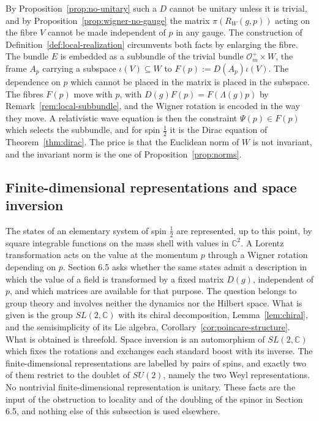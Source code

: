 \begin{remark}
	By Proposition~\ref{prop:no-unitary} such a $D$ cannot be unitary unless it is trivial, and by Proposition~\ref{prop:wigner-no-gauge} the matrix $\pi(R_W(g,p))$ acting on the fibre $V$ cannot be made independent of $p$ in any gauge. The construction of Definition~\ref{def:local-realization} circumvents both facts by enlarging the fibre. The bundle $E$ is embedded as a subbundle of the trivial bundle $\mathcal{O}_m^+\times W$, the frame $A_p$ carrying a subspace $\iota(V)\subseteq W$ to $F(p):=D(A_p)\iota(V)$. The dependence on $p$ which cannot be placed in the matrix is placed in the subspace. The fibres $F(p)$ move with $p$, with $D(g)F(p)=F(\Lambda(g)p)$ by Remark~\ref{rem:local-subbundle}, and the Wigner rotation is encoded in the way they move. A relativistic wave equation is then the constraint $\Psi(p)\in F(p)$ which selects the subbundle, and for spin $\tfrac12$ it is the Dirac equation of Theorem~\ref{thm:dirac}. The price is that the Euclidean norm of $W$ is not invariant, and the invariant norm is the one of Proposition~\ref{prop:norms}.
\end{remark}

\subsection{Finite-dimensional representations and space inversion}
\label{subsec:finite-reps-inversion}

The states of an elementary system of spin $\frac12$ are represented, up to this point, by square integrable functions on the mass shell with values in $\mathbb{C}^2$. A Lorentz transformation acts on the value at the momentum $p$ through a Wigner rotation depending on $p$. Section 6.5 asks whether the same states admit a description in which the value of a field is transformed by a fixed matrix $D(g)$, independent of $p$, and which matrices are available for that purpose. The question belongs to group theory and involves neither the dynamics nor the Hilbert space. What is given is the group $SL(2,\mathbb{C})$ with its chiral decomposition, Lemma~\ref{lem:chiral}, and the semisimplicity of its Lie algebra, Corollary~\ref{cor:poincare-structure}. What is obtained is threefold. Space inversion is an automorphism of $SL(2,\mathbb{C})$ which fixes the rotations and exchanges each standard boost with its inverse. The finite-dimensional representations are labelled by pairs of spins, and exactly two of them restrict to the doublet of $SU(2)$, namely the two Weyl representations. No nontrivial finite-dimensional representation is unitary. These facts are the input of the obstruction to locality and of the doubling of the spinor in Section 6.5, and nothing else of this subsection is used elsewhere.


